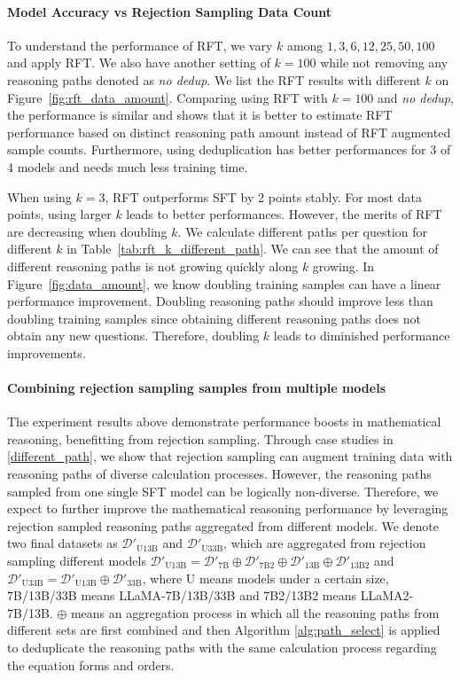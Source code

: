 \paragraph{Model Accuracy vs Rejection Sampling Data Count}

To understand the performance of RFT, we vary $k$ among ${1,3,6,12,25,50,100}$ and apply RFT. We also have another setting of $k=100$ while not removing any reasoning paths denoted as \textit{no dedup}. We list the RFT results with different $k$ on Figure~\ref{fig:rft_data_amount}.
Comparing using RFT with $k=100$ and \textit{no dedup}, the performance is similar and shows that it is better to estimate RFT performance based on distinct reasoning path amount instead of RFT augmented sample counts. Furthermore, using deduplication has better performances for 3 of 4 models and needs much less training time. 

When using $k=3$, RFT outperforms SFT by 2 points stably. For most data points, using larger $k$ leads to better performances. However, the merits of RFT are decreasing when doubling $k$. We calculate different paths per question for different $k$ in Table~\ref{tab:rft_k_different_path}. We can see that the amount of different reasoning paths is not growing quickly along $k$ growing. In Figure~\ref{fig:data_amount}, we know doubling training samples can have a linear performance improvement. Doubling reasoning paths should improve less than doubling training samples since obtaining different reasoning paths does not obtain any new questions. Therefore, doubling $k$ leads to diminished performance improvements.

\paragraph{Combining rejection sampling samples from multiple models} 

The experiment results above demonstrate performance boosts in mathematical reasoning, benefitting from rejection sampling. Through case studies in \ref{different_path}, we show that rejection sampling can augment training data with reasoning paths of diverse calculation processes. However, the reasoning paths sampled from one single SFT model can be logically non-diverse. Therefore, we expect to further improve the mathematical reasoning performance by leveraging rejection sampled reasoning paths aggregated from different models. We denote two final datasets as $\mathcal{D}'_{\text{U13B}}$ and $\mathcal{D}'_{\text{U33B}}$, which are aggregated from rejection sampling different models $ \mathcal{D}'_{\text{U13B}} = \mathcal{D}'_{\text{7B}} \oplus \mathcal{D}'_{\text{7B2}} \oplus \mathcal{D}'_{\text{13B}} \oplus \mathcal{D}'_{\text{13B2}}$ and $\mathcal{D}'_{\text{U33B}} = \mathcal{D}'_{\text{U13B}} \oplus \mathcal{D}'_{\text{33B}}$, where U means models under a certain size, 7B/13B/33B means LLaMA-7B/13B/33B and 7B2/13B2 means LLaMA2-7B/13B. $\oplus$ means an aggregation process in which all the reasoning paths from different sets are first combined and then Algorithm \ref{alg:path_select} is applied to deduplicate the reasoning paths with the same calculation process regarding the equation forms and orders.

